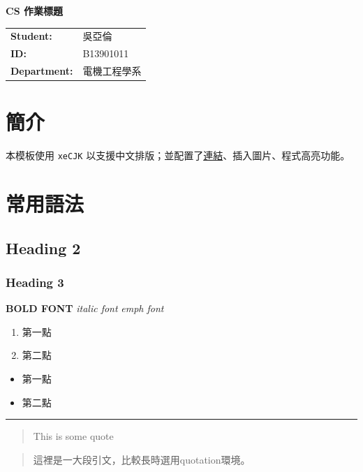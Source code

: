 \documentclass[12pt]{article}
\begin{document}
\thispagestyle{fancy}


\begin{center}
  {\Large \bfseries CS 作業標題}
\end{center}

\vspace{2em}

\begin{tabular}{@{}l l}
  \textbf{Student:} & 吳亞倫 \\
  \textbf{ID:} & B13901011  \\
  \textbf{Department:} & 電機工程學系
\end{tabular}
\bigskip

\tableofcontents
\clearpage

\section{簡介}
本模板使用 \texttt{xeCJK} 以支援中文排版；並配置了\href{https://youtu.be/dQw4w9WgXcQ}{連結}、插入圖片、程式高亮功能。

\section{常用語法}
\subsection{Heading 2}
\subsubsection{Heading 3}
\textbf{BOLD FONT}
\textit{italic font}
\emph{emph font}
\begin{enumerate}
  \item 第一點
  \item 第二點
\end{enumerate}
\begin{itemize}
  \item 第一點
  \item 第二點
\end{itemize}
\hrule
\begin{quote}
  This is some quote
\end{quote}
\begin{quotation}
  這裡是一大段引文，比較長時選用quotation環境。
\end{quotation}
\end{document}
